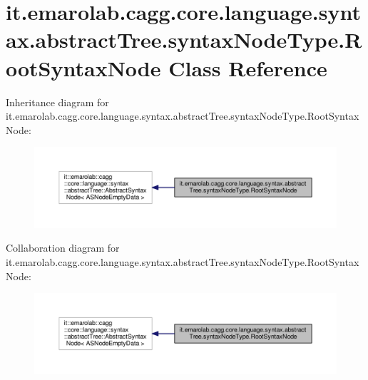 \hypertarget{classit_1_1emarolab_1_1cagg_1_1core_1_1language_1_1syntax_1_1abstractTree_1_1syntaxNodeType_1_1RootSyntaxNode}{\section{it.\-emarolab.\-cagg.\-core.\-language.\-syntax.\-abstract\-Tree.\-syntax\-Node\-Type.\-Root\-Syntax\-Node Class Reference}
\label{classit_1_1emarolab_1_1cagg_1_1core_1_1language_1_1syntax_1_1abstractTree_1_1syntaxNodeType_1_1RootSyntaxNode}
}


Inheritance diagram for it.\-emarolab.\-cagg.\-core.\-language.\-syntax.\-abstract\-Tree.\-syntax\-Node\-Type.\-Root\-Syntax\-Node\-:\nopagebreak
\begin{figure}[H]
\begin{center}
\leavevmode
\includegraphics[width=350pt]{classit_1_1emarolab_1_1cagg_1_1core_1_1language_1_1syntax_1_1abstractTree_1_1syntaxNodeType_1_1RootSyntaxNode__inherit__graph}
\end{center}
\end{figure}


Collaboration diagram for it.\-emarolab.\-cagg.\-core.\-language.\-syntax.\-abstract\-Tree.\-syntax\-Node\-Type.\-Root\-Syntax\-Node\-:\nopagebreak
\begin{figure}[H]
\begin{center}
\leavevmode
\includegraphics[width=350pt]{classit_1_1emarolab_1_1cagg_1_1core_1_1language_1_1syntax_1_1abstractTree_1_1syntaxNodeType_1_1RootSyntaxNode__coll__graph}
\end{center}
\end{figure}
